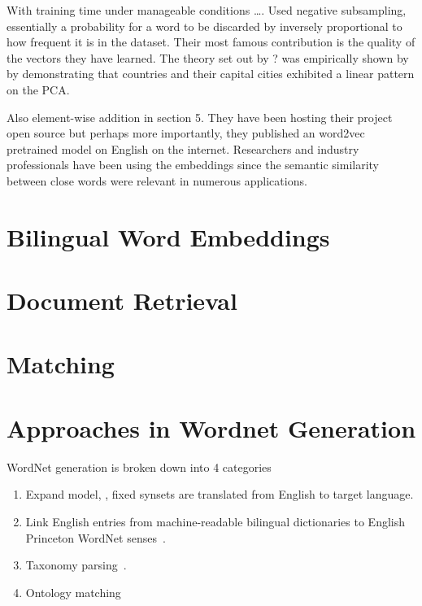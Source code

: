 With training time under manageable conditions \ldots.
Used negative subsampling, essentially a probability for a word to be discarded by inversely proportional to how frequent it is in the dataset.
Their most famous contribution is the quality of the vectors they have learned.
The theory set out by ? was empirically shown by \citeauthor{mikolov_distributed_2013} by demonstrating that countries and their capital cities exhibited a linear pattern on the PCA.

Also element-wise addition in section 5.
They have been hosting their project open source but perhaps more importantly, they published an word2vec pretrained model on English on the internet.
Researchers and industry professionals have been using the embeddings since the semantic similarity between close words were relevant in numerous applications.

\section{Bilingual Word Embeddings}%
\label{sec:bilingual_word_embeddings}

\section{Document Retrieval}%
\label{sec:document_retrieval}

\section{Matching}%
\label{sec:matching}

\section{Approaches in Wordnet Generation}%
\label{sec:approaches_in_wordnet_generation}

WordNet generation is broken down into 4 categories
\begin{enumerate}
    \item Expand model, \textcite{vossen_introduction_1998}, fixed synsets are translated from English to target language.
    \item Link English entries from machine-readable bilingual dictionaries to English Princeton WordNet senses~\textcite{knight_building_1994}.
    \item Taxonomy parsing~\textcite{farreres_using_1998}.
    \item Ontology matching~\textcite{farreres_towards_2004}
\end{enumerate}

